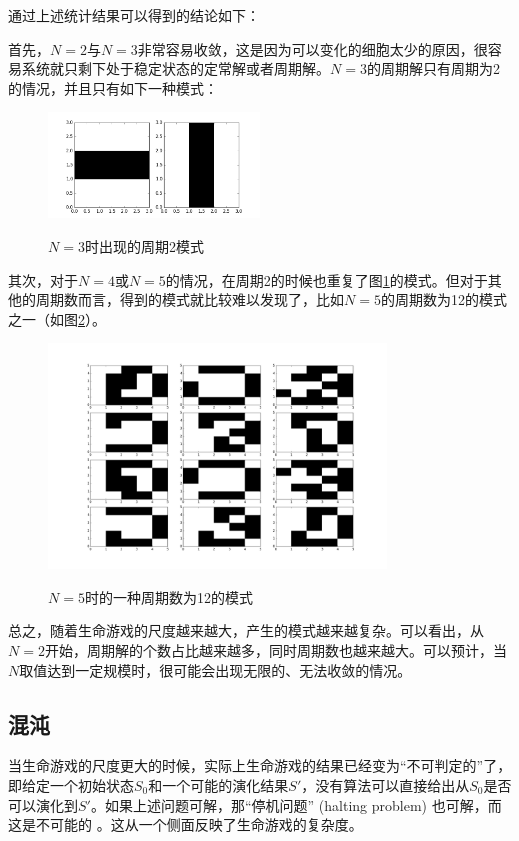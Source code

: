 \documentclass[a4paper,12pt]{report}
\begin{document}
通过上述统计结果可以得到的结论如下：

首先，$N=2$与$N=3$非常容易收敛，这是因为可以变化的细胞太少的原因，很容易系统就只剩下处于稳定状态的定常解或者周期解。$N=3$的周期解只有周期为2的情况，并且只有如下一种模式：

\begin{figure}[!ht]
\centering
\includegraphics[width=0.5\textwidth]{images/img32.png}
\label{fig:n3}
\caption{$N=3$时出现的周期2模式}
\end{figure}

其次，对于$N=4$或$N=5$的情况，在周期2的时候也重复了图\ref{fig:n3}的模式。但对于其他的周期数而言，得到的模式就比较难以发现了，比如$N=5$的周期数为12的模式之一（如图\ref{fig:n5}）。

\begin{figure}[!ht]
\centering
\includegraphics[width=0.8\textwidth]{images/img512.png}
\label{fig:n5}
\caption{$N=5$时的一种周期数为12的模式}
\end{figure}

总之，随着生命游戏的尺度越来越大，产生的模式越来越复杂。可以看出，从$N=2$开始，周期解的个数占比越来越多，同时周期数也越来越大。可以预计，当$N$取值达到一定规模时，很可能会出现无限的、无法收敛的情况。

\subsection{混沌}

当生命游戏的尺度更大的时候，实际上生命游戏的结果已经变为“不可判定的”了，即给定一个初始状态$S_0$和一个可能的演化结果$S'$，没有算法可以直接给出从$S_0$是否可以演化到$S'$。如果上述问题可解，那“停机问题” (halting problem) 也可解，而这是不可能的
\supercite{berlekamp2004winning}。这从一个侧面反映了生命游戏的复杂度。
\end{document}
